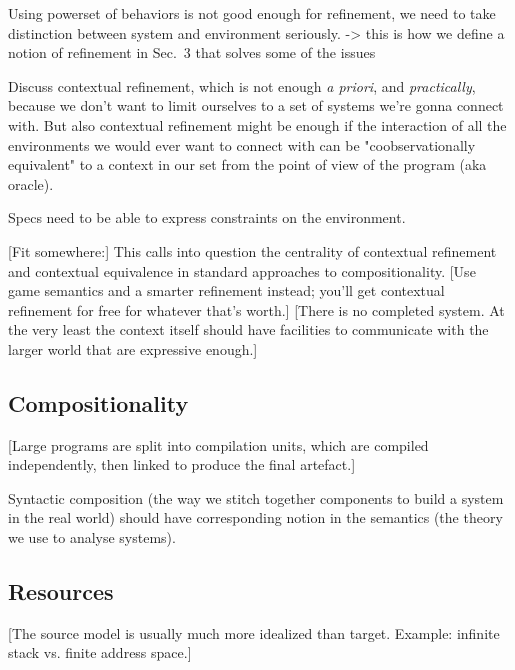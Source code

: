 Using powerset of behaviors is not good enough for refinement,
we need to take distinction between system and environment seriously.
-> this is how we define a notion of refinement in Sec.~3
that solves some of the issues

Discuss contextual refinement,
which is not enough \emph{a priori}, and \emph{practically},
because we don't want to limit ourselves to a set of systems we're gonna connect with.
But also contextual refinement might be enough
if the interaction of all the environments we would ever want to connect with
can be "coobservationally equivalent" to a context in our set
from the point of view of the program (aka oracle).

Specs need to be able to express constraints on the environment.

[Fit somewhere:]
This calls into question
the centrality of contextual refinement and contextual equivalence
in standard approaches to compositionality.
[Use game semantics and a smarter refinement instead;
you'll get contextual refinement for free
for whatever that's worth.]
[There is no completed system.
At the very least the context itself
should have facilities to communicate with the larger world
that are expressive enough.]


\subsection{Compositionality} %

[Large programs are split into compilation units,
which are compiled independently,
then linked to produce the final artefact.]

Syntactic composition
(the way we stitch together components to build a system in the real world)
should have corresponding notion
in the semantics
(the theory we use to analyse systems).


\subsection{Resources} %

[The source model is usually much more idealized than target.
Example: infinite stack vs. finite address space.]

